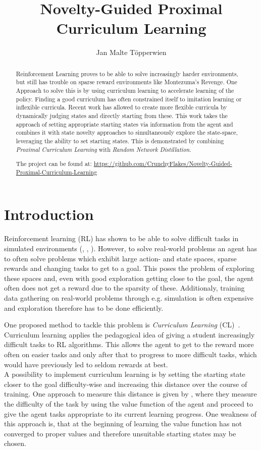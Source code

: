 \documentclass{article}
\title{Novelty-Guided Proximal Curriculum Learning}
\author{Jan Malte Töpperwien}
\begin{document}
\maketitle
\begin{abstract}
  Reinforcement Learning proves to be able to solve increasingly harder environments, but still has trouble on sparse reward environments like Montezuma's Revenge. One Approach to solve this is by using curriculum learning to accelerate learning of the policy. Finding a good curriculum has often constrained itself to imitation learning or inflexible curricula. Recent work has allowed to create more flexible curricula by dynamically judging states and directly starting from these. This work takes the approach of setting appropriate starting states via information from the agent and combines it with state novelty approaches to simultaneously explore the state-space, leveraging the ability to set starting states. This is demonstrated by combining \textit{Proximal Curriculum Learning} with \textit{Random Network Distillation}.

  The project can be found at: \url{https://github.com/CrunchyFlakes/Novelty-Guided-Proximal-Curriculum-Learning}
\end{abstract}
\section{Introduction}
Reinforcement learning (RL) has shown to be able to solve difficult tasks in simulated environments (\citep{human_level_control}, \citep{continuous_control}, \citep{rl_go}). However, to solve real-world problems an agent has to often solve problems which exhibit large action- and state spaces, sparse rewards and changing tasks to get to a goal. This poses the problem of exploring these spaces and, even with good exploration getting close to the goal, the agent often does not get a reward due to the sparsity of these. Additionaly, training data gathering on real-world problems through e.g. simulation is often expensive and exploration therefore has to be done efficiently.

One proposed method to tackle this problem is \textit{Curriculum Learning} (CL)~\citep{curr}. Curriculum learning applies the pedagogical idea of giving a student increasingly difficult tasks to RL algorithms. This allows the agent to get to the reward more often on easier tasks and only after that to progress to more difficult tasks, which would have previously led to seldom rewards at best. \\
A possibility to implement curriculum learning is by setting the starting state closer to the goal difficulty-wise and increasing this distance over the course of training. One approach to measure this distance is given by \cite{prox_curr}, where they measure the difficulty of the task by using the value function of the agent and proceed to give the agent tasks appropriate to its current learning progress. One weakness of this approach is, that at the beginning of learning the value function has not converged to proper values and therefore unsuitable starting states may be chosen.
\end{document}
